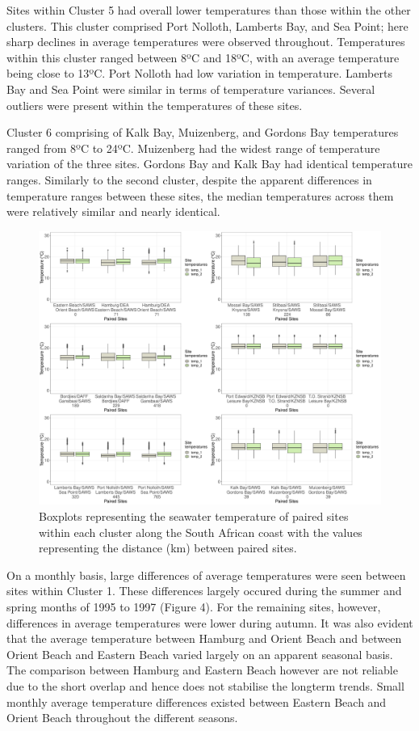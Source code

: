 \documentclass[10pt,a4paper,]{article}
\begin{document}
Sites within Cluster 5 had overall lower temperatures than those within
the other clusters. This cluster comprised Port Nolloth, Lamberts Bay,
and Sea Point; here sharp declines in average temperatures were observed
throughout. Temperatures within this cluster ranged between 8ºC and
18ºC, with an average temperature being close to 13ºC. Port Nolloth had
low variation in temperature. Lamberts Bay and Sea Point were similar in
terms of temperature variances. Several outliers were present within the
temperatures of these sites.

Cluster 6 comprising of Kalk Bay, Muizenberg, and Gordons Bay
temperatures ranged from 8ºC to 24ºC. Muizenberg had the widest range of
temperature variation of the three sites. Gordons Bay and Kalk Bay had
identical temperature ranges. Similarly to the second cluster, despite
the apparent differences in temperature ranges between these sites, the
median temperatures across them were relatively similar and nearly
identical.

\begin{figure}
\centering
\includegraphics{../figures/combined_plot.pdf}
\caption{Boxplots representing the seawater temperature of paired sites
within each cluster along the South African coast with the values
representing the distance (km) between paired sites.}
\end{figure}

On a monthly basis, large differences of average temperatures were seen
between sites within Cluster 1. These differences largely occured during
the summer and spring months of 1995 to 1997 (Figure 4). For the
remaining sites, however, differences in average temperatures were lower
during autumn. It was also evident that the average temperature between
Hamburg and Orient Beach and between Orient Beach and Eastern Beach
varied largely on an apparent seasonal basis. The comparison between
Hamburg and Eastern Beach however are not reliable due to the short
overlap and hence does not stabilise the longterm trends. Small monthly
average temperature differences existed between Eastern Beach and Orient
Beach throughout the different seasons.
\end{document}
